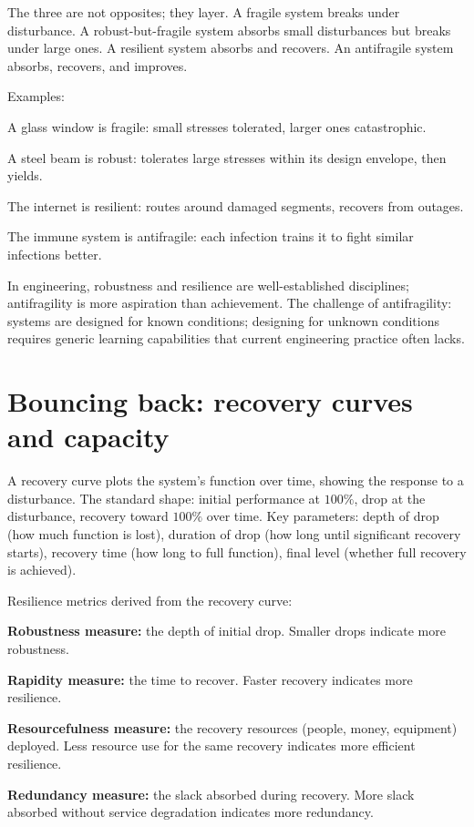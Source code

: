 The three are not opposites; they layer. A fragile system breaks under disturbance. A robust-but-fragile system absorbs small disturbances but breaks under large ones. A resilient system absorbs and recovers. An antifragile system absorbs, recovers, and improves.

Examples:

A glass window is fragile: small stresses tolerated, larger ones catastrophic.

A steel beam is robust: tolerates large stresses within its design envelope, then yields.

The internet is resilient: routes around damaged segments, recovers from outages.

The immune system is antifragile: each infection trains it to fight similar infections better.

In engineering, robustness and resilience are well-established disciplines; antifragility is more aspiration than achievement. The challenge of antifragility: systems are designed for known conditions; designing for unknown conditions requires generic learning capabilities that current engineering practice often lacks.

\section{Bouncing back: recovery curves and capacity}

A recovery curve plots the system's function over time, showing the response to a disturbance. The standard shape: initial performance at $100\%$, drop at the disturbance, recovery toward $100\%$ over time. Key parameters: depth of drop (how much function is lost), duration of drop (how long until significant recovery starts), recovery time (how long to full function), final level (whether full recovery is achieved).

Resilience metrics derived from the recovery curve:

\textbf{Robustness measure:} the depth of initial drop. Smaller drops indicate more robustness.

\textbf{Rapidity measure:} the time to recover. Faster recovery indicates more resilience.

\textbf{Resourcefulness measure:} the recovery resources (people, money, equipment) deployed. Less resource use for the same recovery indicates more efficient resilience.

\textbf{Redundancy measure:} the slack absorbed during recovery. More slack absorbed without service degradation indicates more redundancy.

